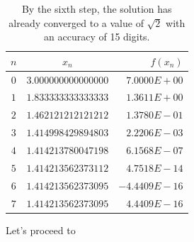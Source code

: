 \begin{example}
\begin{table}[ht!]
\begin{tabular}{|c|c|r|} \hline 
$n$ & $x_n$ & $f(x_n)$ \\ \hline \hline 
$0$ & $3.000000000000000$ & $7.0000E+00$ \\ \hline 
$1$ & $1.833333333333333$ & $1.3611E+00$ \\ \hline 
$2$ & $1.462121212121212$ & $1.3780E-01$ \\ \hline 
$3$ & $1.414998429894803$ & $2.2206E-03$ \\ \hline 
$4$ & $1.414213780047198$ & $6.1568E-07$ \\ \hline 
$5$ & $1.414213562373112$ & $4.7518E-14$ \\ \hline 
$6$ & $1.414213562373095$ & $-4.4409E-16$ \\ \hline 
$7$ & $1.414213562373095$ & $4.4409E-16$ \\ \hline 
\end{tabular}
\caption{By the sixth step, the solution has already converged to a value of $\sqrt{2}$ with an accuracy of 15 digits.}
\label{table:Newton-Raphson}
\end{table}
\end{example}

Let's proceed to 
